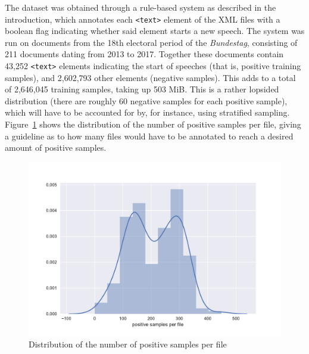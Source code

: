 The dataset was obtained through a rule-based system as described in the
introduction, which annotates each \texttt{<text>} element of the XML files with
a boolean flag indicating whether said element starts a new speech. The system
was run on documents from the 18th electoral period of the \emph{Bundestag},
consisting of 211 documents dating from 2013 to 2017. Together these documents
contain 43,252 \texttt{<text>} elements indicating the start of speeches (that
is, positive training samples), and 2,602,793 other elements (negative samples).
This adds to a total of 2,646,045 training samples, taking up 503 MiB. This is a
rather lopsided distribution (there are roughly 60 negative samples for each
positive sample), which will have to be accounted for by, for instance, using
stratified sampling. Figure~\ref{fig:data_dist} shows the distribution of the
number of positive samples per file, giving a guideline as to how many files
would have to be annotated to reach a desired amount of positive samples.

\begin{figure}[htbp]
  \centering
  \includegraphics[width=\textwidth]{figures/distribution.pdf}
  \caption{Distribution of the number of positive samples per file}
  \label{fig:data_dist}
\end{figure}

